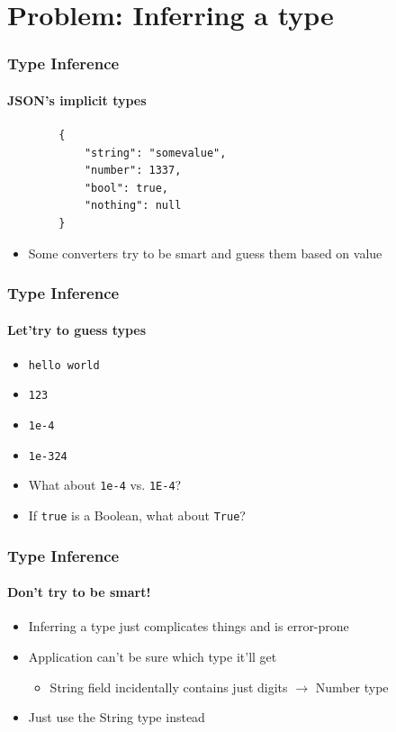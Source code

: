 \documentclass[
    alternativetitlepage=alternativ,
    cornerlogo=hgi_nds_logo2,
    sectionoverview,
]{rubpresentation}
\begin{document}
\section{Problem: Inferring a type}
\begin{frame}[fragile]
    \frametitle{Type Inference}
    \framesubtitle{JSON's implicit types}
    \begin{verbatim}
        {
            "string": "somevalue",
            "number": 1337,
            "bool": true,
            "nothing": null
        }
    \end{verbatim}
    \begin{itemize}
        \item{} Some converters try to be smart and guess them based on value
    \end{itemize}
\end{frame}

\begin{frame}
    \frametitle{Type Inference}
    \framesubtitle{Let'try to guess types}
    \begin{itemize}
        \item{} \texttt{hello world} 
        \item<3->{} \texttt{123} 
        \item<5->{} \texttt{1e-4} 
        \item<7->{} \texttt{1e-324} 
        \item<9->{} What about \texttt{1e-4} vs. \texttt{1E-4}?
        \item<10->{} If \texttt{true} is a Boolean, what about \texttt{True}?
    \end{itemize}
\end{frame}

\begin{frame}
    \frametitle{Type Inference}
    \framesubtitle{Don't try to be smart!}
    \begin{itemize}
        \item{} Inferring a type just complicates things and is error-prone
        \item{} Application can't be sure which type it'll get
        \begin{itemize}
            \item{} String field incidentally contains just digits $\rightarrow$ Number type
        \end{itemize}
        \item{} Just use the String type instead
    \end{itemize}
\end{frame}
\end{document}
